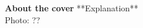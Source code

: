 \graphicspath{{0_FrontMatter/Figures/}}

\begingroup
\setlength{\parindent}{0pt}

%
\thispagestyle{empty}
\vspace*{3cm}
\begin{center}
\iftuefont
\huge{\tuefontscala\selectfont\maintitle}\\[15mm]%
\Large{\tuefontscala\selectfont \@author}
\else
\huge{\sffamily\bfseries\selectfont\maintitle}\\[15mm]%
\Large{\sffamily\selectfont \@author }
\fi
\end{center}

\newpage
\thispagestyle{empty}
\textbf{About the cover}
**Explanation**\\
{\footnotesize Photo: ??}

\vspace*{\fill}



